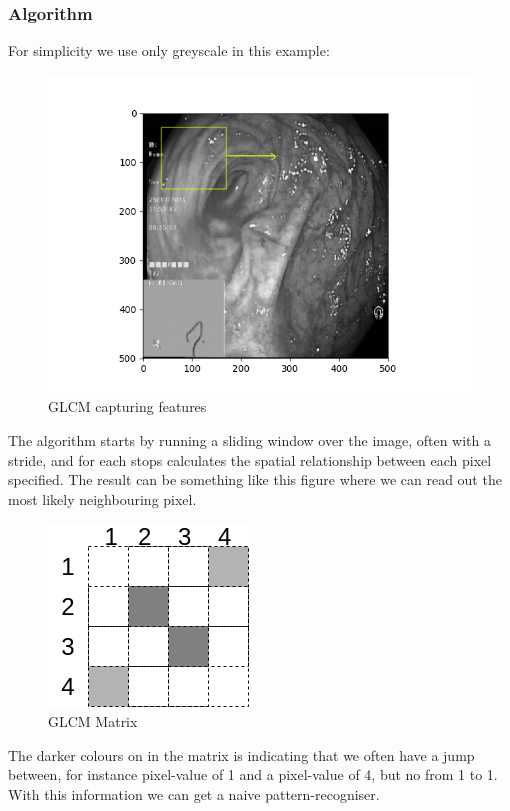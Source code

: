 	    \subsubsection{Algorithm}
	      For simplicity we use only greyscale in this example:
	      \begin{figure}[ht]
		\centering
		\includegraphics[scale=0.5]{figures/sliding_window_box.png}
		\caption{GLCM capturing features}
	      \end{figure}
	      The algorithm starts by running a sliding window over the image, often with a stride, and for each stops calculates the spatial relationship between each pixel specified.
	      The result can be something like this figure %
	      where we can read out the most likely neighbouring pixel.
	       \begin{figure}[ht]
		\centering
		\includegraphics[scale=0.5]{figures/Simple_GLCM.png}
		\caption{GLCM Matrix}
	      \end{figure}
	      The darker colours on in the matrix is indicating that we often have a jump between, for instance pixel-value of 1 and a pixel-value of 4, but no from 1 to 1.\\
	      With this information we can get a naive pattern-recogniser. 
